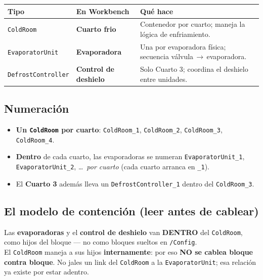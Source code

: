 \documentclass[11pt,a4paper]{article}
\newcommand{\ra}{\textcolor{frio}{$\rightarrow$}}
\newcommand{\code}[1]{\texttt{#1}}
\newcommand{\cabfila}{\color{white}\bfseries}
\begin{document}
\begin{center}\small
\begin{tabular}{L{3.2cm} L{3.2cm} L{7.2cm}}
\toprule
{}\cabfila \textbf{Tipo} & \cabfila \textbf{En Workbench} & \cabfila \textbf{Qué hace} \\
\midrule
{}\code{ColdRoom} & \textbf{Cuarto frio} & Contenedor por cuarto; maneja la lógica de enfriamiento. \\
\code{EvaporatorUnit} & \textbf{Evaporadora} & Una por evaporadora física; secuencia válvula\,\ra\,evaporadora. \\
\code{DefrostController} & \textbf{Control de deshielo} & Solo Cuarto 3; coordina el deshielo entre unidades. \\
\bottomrule
\end{tabular}
\end{center}

\subsection{Numeración}
\begin{itemize}[leftmargin=1.4em,itemsep=2pt]
  \item \textbf{Un \code{ColdRoom} por cuarto}: \code{ColdRoom_1}, \code{ColdRoom_2}, \code{ColdRoom_3}, \code{ColdRoom_4}.
  \item \textbf{Dentro} de cada cuarto, las evaporadoras se numeran \code{EvaporatorUnit_1}, \code{EvaporatorUnit_2}, \dots\ \emph{por cuarto} (cada cuarto arranca en \code{_1}).
  \item El \textbf{Cuarto 3} además lleva un \code{DefrostController_1} dentro del \code{ColdRoom_3}.
\end{itemize}

\subsection{El modelo de contención (leer antes de cablear)}
\begin{importante}
Las \textbf{evaporadoras} y el \textbf{control de deshielo} van \textbf{DENTRO} del \code{ColdRoom},
como hijos del bloque — no como bloques sueltos en \code{/Config}.\\[4pt]
El \code{ColdRoom} maneja a sus hijos \textbf{internamente}: por eso \textbf{NO se cablea
bloque contra bloque}. No jales un link del \code{ColdRoom} a la \code{EvaporatorUnit}; esa
relación ya existe por estar adentro.
\end{importante}
\end{document}
